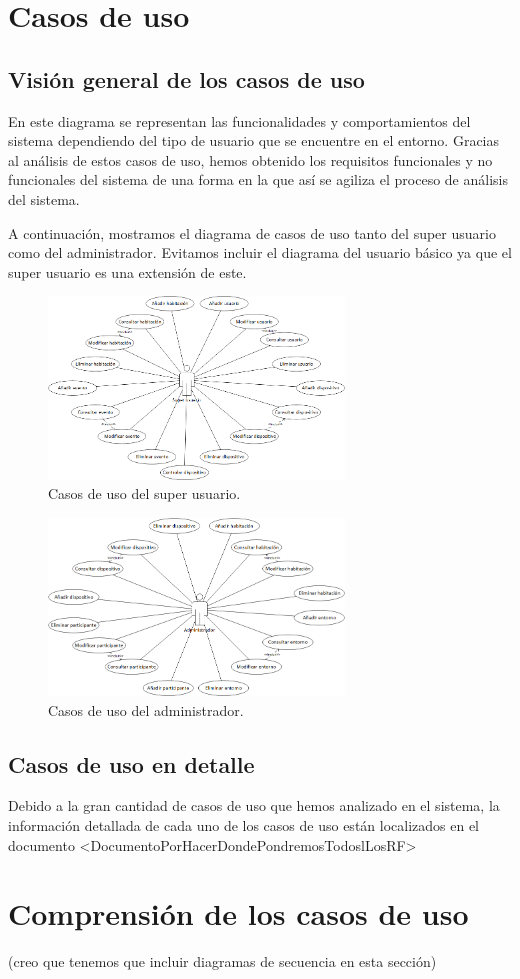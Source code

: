 \section{Casos de uso}
\subsection{Visi\'on general de los casos de uso}
En este diagrama se representan las funcionalidades y comportamientos del sistema dependiendo del tipo de usuario que se encuentre en el entorno. Gracias al an\'alisis de estos casos de uso, hemos obtenido los requisitos funcionales y no funcionales del sistema de una forma en la que as\'i se agiliza el proceso de an\'alisis del sistema.
 
A continuaci\'on, mostramos el diagrama de casos de uso tanto del super usuario como del administrador. Evitamos incluir el diagrama del usuario b\'asico ya que el super usuario es una extensi\'on de este.

\begin{figure}[h!]
	\centering
	\includegraphics[width=0.7\textwidth]{4.Disenio/Imagenes/CU-Superusuario}
	\caption{Casos de uso del super usuario.}
\end{figure}

\begin{figure}[h!]
	\centering
	\includegraphics[width=0.7\textwidth]{4.Disenio/Imagenes/CU-Admin}
	\caption{Casos de uso del administrador.}
\end{figure}


\subsection{Casos de uso en detalle}
Debido a la gran cantidad de casos de uso que hemos analizado en el sistema, la informaci\'on detallada de cada uno de los casos de uso est\'an localizados en el documento <DocumentoPorHacerDondePondremosTodoslLosRF>
\section{Comprensi\'on de los casos de uso}
(creo que tenemos que incluir diagramas de secuencia en esta secci\'on)